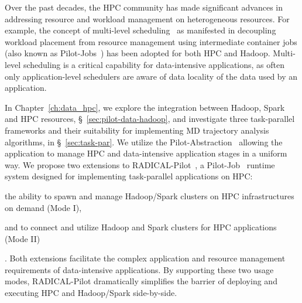 Over the past decades, the HPC community has made significant advances in addressing resource and workload management on heterogeneous resources.
For example, the concept of multi-level scheduling~\cite{berman1996application} as manifested in decoupling workload placement from resource management using intermediate container jobs (also known as Pilot-Jobs~\cite{luckow2012pstar}) has been adopted for both HPC and Hadoop.
Multi-level scheduling is a critical capability for data-intensive applications, as often only application-level schedulers are aware of data locality of the data used by an application.


In Chapter~\ref{ch:data_hpc}, we explore the integration between Hadoop, Spark and HPC resources, \S~\ref{sec:pilot-data-hadoop}, and investigate three task-parallel frameworks and their suitability for implementing MD trajectory analysis algorithms, in \S~\ref{sec:task-par}.
We utilize the Pilot-Abstraction~\cite{luckow2012pstar} allowing the application to manage HPC and data-intensive application stages in a uniform way.
We propose two extensions to RADICAL-Pilot~\cite{merzky2018design}, a Pilot-Job~\cite{luckow2012pstar} runtime system designed for implementing task-parallel applications on HPC: 
\begin{inparaenum}[(i)]
    \item the ability to spawn and manage Hadoop/Spark clusters on HPC infrastructures on demand (Mode I),
    \item and to connect and utilize Hadoop and Spark clusters for HPC applications (Mode II)
\end{inparaenum}.
Both extensions facilitate the complex application and resource management requirements of data-intensive applications.
By supporting these two usage modes, RADICAL-Pilot dramatically simplifies the barrier of deploying and executing HPC and Hadoop/Spark side-by-side.

